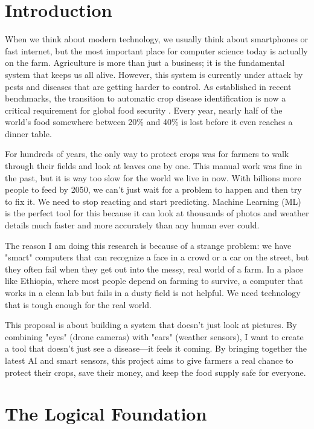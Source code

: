 \documentclass[12pt,a4paper]{article}
\begin{document}
\section{Introduction}

When we think about modern technology, we usually think about smartphones or fast internet, but the most important place for computer science today is actually on the farm. Agriculture is more than just a business; it is the fundamental system that keeps us all alive. However, this system is currently under attack by pests and diseases that are getting harder to control. As established in recent benchmarks, the transition to automatic crop disease identification is now a critical requirement for global food security \cite{karthik2023}. Every year, nearly half of the world's food somewhere between 20\% and 40\% is lost before it even reaches a dinner table.

For hundreds of years, the only way to protect crops was for farmers to walk through their fields and look at leaves one by one. This manual work was fine in the past, but it is way too slow for the world we live in now. With billions more people to feed by 2050, we can't just wait for a problem to happen and then try to fix it. We need to stop reacting and start predicting. Machine Learning (ML) is the perfect tool for this because it can look at thousands of photos and weather details much faster and more accurately than any human ever could.

The reason I am doing this research is because of a strange problem: we have "smart" computers that can recognize a face in a crowd or a car on the street, but they often fail when they get out into the messy, real world of a farm. In a place like Ethiopia, where most people depend on farming to survive, a computer that works in a clean lab but fails in a dusty field is not helpful. We need technology that is tough enough for the real world.

This proposal is about building a system that doesn't just look at pictures. By combining "eyes" (drone cameras) with "ears" (weather sensors), I want to create a tool that doesn't just see a disease—it feels it coming. By bringing together the latest AI and smart sensors, this project aims to give farmers a real chance to protect their crops, save their money, and keep the food supply safe for everyone.

\section{The Logical Foundation} 
\end{document}
